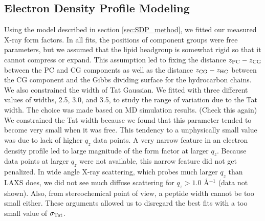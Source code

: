\subsection{Electron Density Profile Modeling}\label{sec:SDP_results}
Using the model described in section \ref{sec:SDP_method}, 
we fitted our measured X-ray form factors. In all fits,
the positions of component groups were free parameters, but we 
assumed that the lipid headgroup is somewhat rigid so that it cannot compress
or expand. This assumption led to fixing the distance
$z_\textrm{PC}-z_\textrm{CG}$ between the PC and CG components as well
as the distance $z_\textrm{CG}-z_\textrm{HC}$ between the CG component and the Gibbs dividing
surface for the hydrocarbon chains. 
We also constrained the width of Tat 
Gaussian. We fitted with three different values of widths,
2.5, 3.0, and 3.5, to study the range of variation due to the Tat width. 
The choice was made based on MD simulation results. (Check this again)
We constrained the Tat width 
because we found that this parameter tended to become very small
when it was free. This tendency to a unphysically small value was due to 
lack of higher $q_z$ data points. A very narrow feature in an electron density profile
led to large magnitude of the form factor at larger $q_z$. Because data 
points at larger $q_z$ were not available, this narrow feature did not get penalized. 
In wide angle X-ray scattering, which probes much larger $q_z$ than LAXS does,
we did not see much diffuse scattering for $q_z > 1.0$ \AA$^{-1}$ (data not shown).
Also, from stereochemical point of view, a peptide width cannot be too small either.
These arguments allowed us to disregard the best fits with a too small value
of $\sigma_\textrm{Tat}$.

